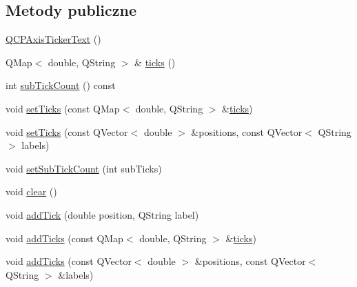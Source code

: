 \subsection*{Metody publiczne}
\begin{DoxyCompactItemize}
\item 
\hyperlink{class_q_c_p_axis_ticker_text_a1d7243b1256c1aa9d1d5b99b2e84e648}{Q\+C\+P\+Axis\+Ticker\+Text} ()
\item 
Q\+Map$<$ double, Q\+String $>$ \& \hyperlink{class_q_c_p_axis_ticker_text_ac84622a6bb4f2a98474e185ecaf3189a}{ticks} ()
\item 
int \hyperlink{class_q_c_p_axis_ticker_text_a47eabd2e4218d2cf3aee7c25e743396f}{sub\+Tick\+Count} () const 
\item 
void \hyperlink{class_q_c_p_axis_ticker_text_a8cdf1f21940f1f53f5e3d30b2c74f5cf}{set\+Ticks} (const Q\+Map$<$ double, Q\+String $>$ \&\hyperlink{class_q_c_p_axis_ticker_text_ac84622a6bb4f2a98474e185ecaf3189a}{ticks})
\item 
void \hyperlink{class_q_c_p_axis_ticker_text_a69f3898cc1cf11d2437851f959faa1e8}{set\+Ticks} (const Q\+Vector$<$ double $>$ \&positions, const Q\+Vector$<$ Q\+String $>$ labels)
\item 
void \hyperlink{class_q_c_p_axis_ticker_text_a8cfa50c51183c90186892eeef978d571}{set\+Sub\+Tick\+Count} (int sub\+Ticks)
\item 
void \hyperlink{class_q_c_p_axis_ticker_text_a21826d2fcd9a25c194d34d4f67aa1460}{clear} ()
\item 
void \hyperlink{class_q_c_p_axis_ticker_text_aada3db69e5fc6585aaa4ea5d89552eb0}{add\+Tick} (double position, Q\+String label)
\item 
void \hyperlink{class_q_c_p_axis_ticker_text_aba34051300eecaefbedb2df8feff2d45}{add\+Ticks} (const Q\+Map$<$ double, Q\+String $>$ \&\hyperlink{class_q_c_p_axis_ticker_text_ac84622a6bb4f2a98474e185ecaf3189a}{ticks})
\item 
void \hyperlink{class_q_c_p_axis_ticker_text_a8140c730e20b0050e1b702af3db00b2e}{add\+Ticks} (const Q\+Vector$<$ double $>$ \&positions, const Q\+Vector$<$ Q\+String $>$ \&labels)
\end{DoxyCompactItemize}
